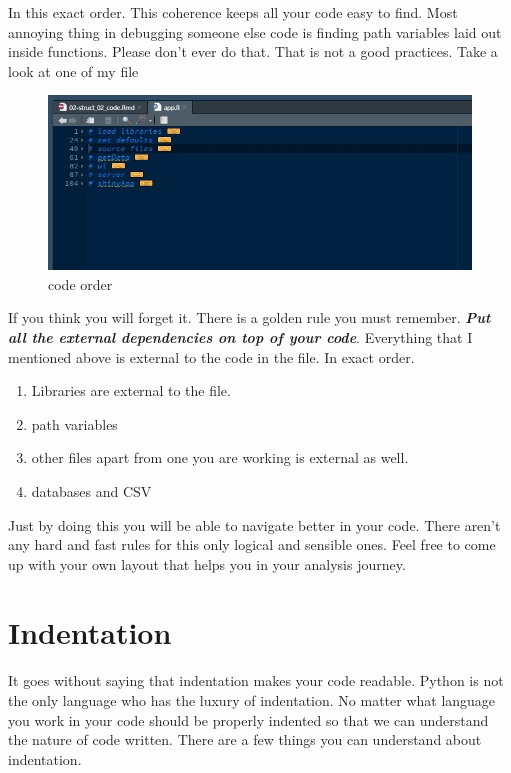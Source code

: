 \documentclass[
]{book}
\providecommand{\tightlist}{%
  \setlength{\itemsep}{0pt}\setlength{\parskip}{0pt}}
\begin{document}
In this exact order. This coherence keeps all your code easy to find. Most annoying thing in debugging someone else code is finding path variables laid out inside functions. Please don't ever do that. That is not a good practices. Take a look at one of my file

\begin{figure}
\centering
\includegraphics{./figures/scrn_section_order.jpg}
\caption{code order}
\end{figure}

If you think you will forget it. There is a golden rule you must remember. \textbf{\emph{Put all the external dependencies on top of your code}}. Everything that I mentioned above is external to the code in the file. In exact order.

\begin{enumerate}
\def\labelenumi{\arabic{enumi}.}
\tightlist
\item
  Libraries are external to the file.
\item
  path variables
\item
  other files apart from one you are working is external as well.
\item
  databases and CSV
\end{enumerate}

Just by doing this you will be able to navigate better in your code. There aren't any hard and fast rules for this only logical and sensible ones. Feel free to come up with your own layout that helps you in your analysis journey.

\hypertarget{indentation}{%
\section{Indentation}\label{indentation}}

It goes without saying that indentation makes your code readable. Python is not the only language who has the luxury of indentation. No matter what language you work in your code should be properly indented so that we can understand the nature of code written. There are a few things you can understand about indentation.
\end{document}
